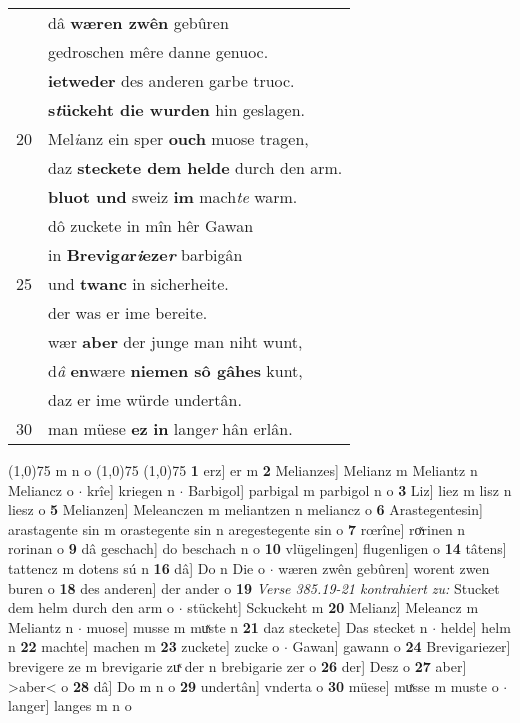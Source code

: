 \documentclass[8pt,a4paper,notitlepage]{article}
\begin{document}
\begin{table}[ht]
\begin{minipage}[t]{0.5\linewidth}
\begin{tabular}{rl}
 & dâ \textbf{wæren zwên} gebûren\\ 
 & gedroschen mêre danne genuoc.\\ 
 & \textbf{ietweder} des anderen garbe truoc.\\ 
 & \textbf{s\textit{t}ückeht die wurden} hin geslagen.\\ 
20 & Mel\textit{i}anz ein sper \textbf{ouch} muose tragen,\\ 
 & daz \textbf{steckete dem helde} durch den arm.\\ 
 & \textbf{bluot und} sweiz \textbf{im} mach\textit{te} warm.\\ 
 & dô zuckete in mîn hêr Gawan\\ 
 & in \textbf{Brevig\textit{a}r\textit{i}eze\textit{r}} barbigân\\ 
25 & und \textbf{twanc} in sicherheite.\\ 
 & der was er ime bereite.\\ 
 & wær \textbf{aber} der junge man niht wunt,\\ 
 & d\textit{â} \textbf{en}wære \textbf{niemen sô gâhes} kunt,\\ 
 & daz er ime würde undertân.\\ 
30 & man müese \textbf{ez} \textbf{in} lange\textit{r} hân erlân.\\ 
\end{tabular}
\scriptsize
\line(1,0){75} \newline
m n o \newline
\line(1,0){75} \newline
\newline
\line(1,0){75} \newline
\textbf{1} erz] er m \textbf{2} Melianzes] Melianz m Meliantz n Meliancz o  $\cdot$ krîe] kriegen n  $\cdot$ Barbigol] parbigal m parbigol n o \textbf{3} Liz] liez m lisz n liesz o \textbf{5} Melianzen] Meleanczen m meliantzen n meliancz o \textbf{6} Arastegentesin] arastagente sin m orastegente sin n aregestegente sin o \textbf{7} rœrîne] roͯrinen n rorinan o \textbf{9} dâ geschach] do beschach n o \textbf{10} vlügelingen] flugenligen o \textbf{14} tâtens] tattencz m dotens sú n \textbf{16} dâ] Do n Die o  $\cdot$ wæren zwên gebûren] worent zwen buren o \textbf{18} des anderen] der ander o \textbf{19} \textit{Verse 385.19-21 kontrahiert zu:} Stucket dem helm durch den arm o   $\cdot$ stückeht] Sckuckeht m \textbf{20} Melianz] Meleancz m Meliantz n  $\cdot$ muose] musse m muͯste n \textbf{21} daz steckete] Das stecket n  $\cdot$ helde] helm n \textbf{22} machte] machen m \textbf{23} zuckete] zucke o  $\cdot$ Gawan] gawann o \textbf{24} Brevigariezer] brevigere ze m brevigarie zuͯ der n brebigarie zer o \textbf{26} der] Desz o \textbf{27} aber] >aber< o \textbf{28} dâ] Do m n o \textbf{29} undertân] vnderta o \textbf{30} müese] muͯsse m muste o  $\cdot$ langer] langes m n o \newline
\end{minipage}
\end{table}
\end{document}
